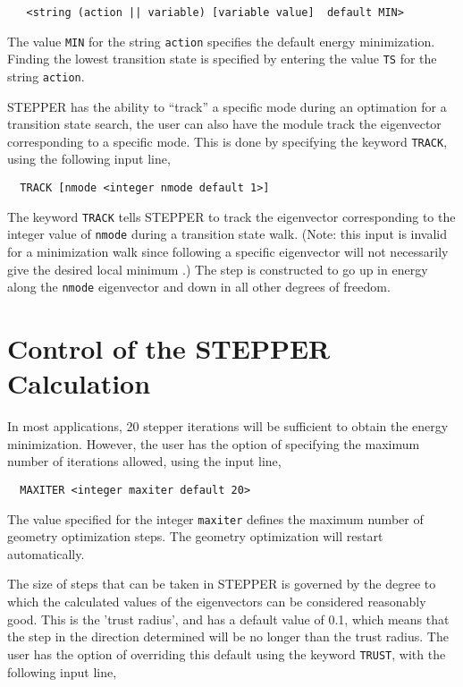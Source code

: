 \begin{verbatim}
   <string (action || variable) [variable value]  default MIN>
\end{verbatim}

The value \verb+MIN+ for the string \verb+action+ specifies the default
energy minimization.  Finding the lowest transition state is specified
by entering the value \verb+TS+ for the string \verb+action+.

STEPPER has the ability to ``track'' a specific mode during an
optimation for a transition state search, the user can also have the
module track the eigenvector corresponding to a specific mode.  This
is done by specifying the keyword \verb+TRACK+, using the following
input line,

\begin{verbatim}
  TRACK [nmode <integer nmode default 1>]
\end{verbatim}

The keyword \verb+TRACK+ tells STEPPER to track the eigenvector
corresponding to the integer value of \verb+nmode+ during a transition
state walk.  (Note: this input is invalid for a minimization walk
since following a specific eigenvector will not necessarily give the
desired local minimum .)  The step is constructed to go up in energy
along the \verb+nmode+ eigenvector and down in all other degrees of
freedom.

\section{Control of the STEPPER Calculation}

In most applications, 20 stepper iterations will be sufficient to
obtain the energy minimization.  However, the user has
the option of specifying the maximum number of iterations allowed,
using the input line,

\begin{verbatim}
  MAXITER <integer maxiter default 20>
\end{verbatim}

The value specified for the integer \verb+maxiter+ defines the maximum 
number of geometry optimization steps.  The
geometry optimization will restart automatically.

The size of steps that can be taken in STEPPER is governed by the degree
to which the calculated values of the eigenvectors can be considered 
reasonably good.  This is the 'trust radius', and has a default value of
0.1, which means that the step in the direction determined will be no
longer than the trust radius.  The user has the option of overriding this
default using the keyword \verb+TRUST+, with the following input line,

